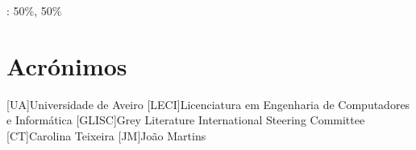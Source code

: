 \documentclass{report}
\begin{document}
\autores : 50\%, 50\%\\

\chapter*{Acrónimos}
\begin{acronym}
[UA]{Universidade de Aveiro}
[LECI]{Licenciatura em Engenharia de Computadores e Informática}
[GLISC]{Grey Literature International Steering Committee}
[CT]{Carolina Teixeira}
[JM]{João Martins}
\end{acronym}


\nocite{*}
\printbibliography
\end{document}
